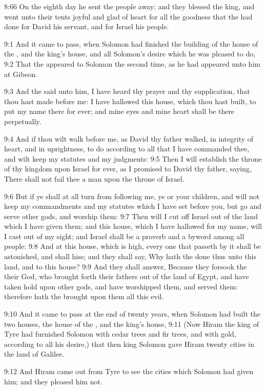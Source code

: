 8:66 On the eighth day he sent the people away: and they blessed the
king, and went unto their tents joyful and glad of heart for all the
goodness that the \LORD had done for David his servant, and for Israel
his people.

9:1 And it came to pass, when Solomon had finished the building of the
house of the \LORD, and the king's house, and all Solomon's desire
which he was pleased to do, 9:2 That the \LORD appeared to Solomon the
second time, as he had appeared unto him at Gibeon.

9:3 And the \LORD said unto him, I have heard thy prayer and thy
supplication, that thou hast made before me: I have hallowed this
house, which thou hast built, to put my name there for ever; and mine
eyes and mine heart shall be there perpetually.

9:4 And if thou wilt walk before me, as David thy father walked, in
integrity of heart, and in uprightness, to do according to all that I
have commanded thee, and wilt keep my statutes and my judgments: 9:5
Then I will establish the throne of thy kingdom upon Israel for ever,
as I promised to David thy father, saying, There shall not fail thee a
man upon the throne of Israel.

9:6 But if ye shall at all turn from following me, ye or your
children, and will not keep my commandments and my statutes which I
have set before you, but go and serve other gods, and worship them:
9:7 Then will I cut off Israel out of the land which I have given
them; and this house, which I have hallowed for my name, will I cast
out of my sight; and Israel shall be a proverb and a byword among all
people: 9:8 And at this house, which is high, every one that passeth
by it shall be astonished, and shall hiss; and they shall say, Why
hath the \LORD done thus unto this land, and to this house?  9:9 And
they shall answer, Because they forsook the \LORD their God, who
brought forth their fathers out of the land of Egypt, and have taken
hold upon other gods, and have worshipped them, and served them:
therefore hath the \LORD brought upon them all this evil.

9:10 And it came to pass at the end of twenty years, when Solomon had
built the two houses, the house of the \LORD, and the king's house,
9:11 (Now Hiram the king of Tyre had furnished Solomon with cedar
trees and fir trees, and with gold, according to all his desire,) that
then king Solomon gave Hiram twenty cities in the land of Galilee.

9:12 And Hiram came out from Tyre to see the cities which Solomon had
given him; and they pleased him not.

